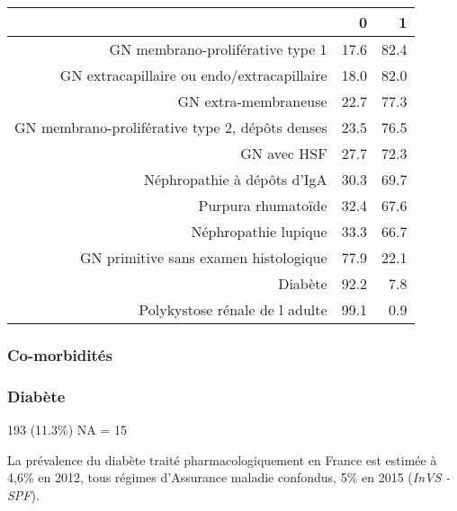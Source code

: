 \documentclass[11pt,a4paper]{article}\usepackage[]{graphicx}\usepackage[]{color}
\begin{document}
\begin{table}[H]
\centering
\begin{tabular}{rrr}
  \hline
 & 0 & 1 \\ 
  \hline
GN membrano-proliférative type 1 & 17.6 & 82.4 \\ 
  GN extracapillaire ou endo/extracapillaire & 18.0 & 82.0 \\ 
  GN extra-membraneuse & 22.7 & 77.3 \\ 
  GN membrano-proliférative type 2, dépôts denses & 23.5 & 76.5 \\ 
  GN avec HSF & 27.7 & 72.3 \\ 
  Néphropathie à dépôts d'IgA & 30.3 & 69.7 \\ 
  Purpura rhumatoïde & 32.4 & 67.6 \\ 
  Néphropathie lupique & 33.3 & 66.7 \\ 
  GN primitive sans examen histologique & 77.9 & 22.1 \\ 
  Diabète & 92.2 & 7.8 \\ 
  Polykystose rénale de l adulte & 99.1 & 0.9 \\ 
   \hline
\end{tabular}
\end{table}


      \subsubsection{Co-morbidités}

\subsubsection*{Diabète}

193 (11.3\%) NA = 15

La prévalence du diabète traité pharmacologiquement en France est estimée à 4,6\% en 2012, tous régimes d’Assurance maladie confondus, 5\% en 2015 (\textit{InVS - SPF}).
\end{document}
